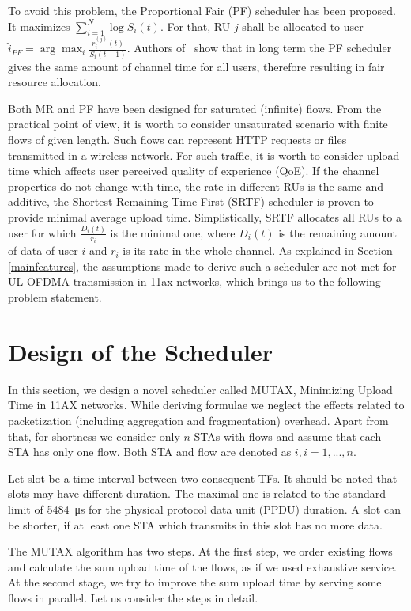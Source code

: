 To avoid this problem, the Proportional Fair (PF) scheduler has been proposed.
It maximizes $\sum_{i=1}^{N} \log{S_i(t)}$.
For that, RU $j$ shall be allocated to user $\hat{i}_{PF}= \arg \max_i \frac{r_i^{(j)}(t)}{S_{i}(t-1)}.$
Authors of~\cite{kwan2009proportional} show that in long term the PF scheduler gives the same amount of channel time for all users, therefore resulting in fair resource allocation.

Both MR and PF have been designed for saturated (infinite) flows.
From the practical point of view, it is worth to consider unsaturated scenario with finite flows of given length.
Such flows can represent HTTP requests or files transmitted in a wireless network.
For such traffic, it is worth to consider upload time which affects user perceived quality of experience (QoE).
If the channel properties do not change with time, the rate in different RUs is the same and additive, the Shortest Remaining Time First (SRTF) scheduler is proven to provide minimal average upload time.
Simplistically, SRTF allocates all RUs to a user for which $\frac{D_i(t)}{r_i}$ is the minimal one, where $D_i(t)$ is the remaining amount of data of user $i$ and $r_i$ is its rate in the whole channel.
As explained in Section \ref{mainfeatures}, the assumptions made to derive such a scheduler are not met for UL OFDMA transmission in 11ax networks, which brings us to the following problem statement.


\section{Design of the Scheduler}
\label{mutex}
In this section, we design a novel scheduler called MUTAX, Minimizing Upload Time in 11AX networks. While deriving formulae we neglect the effects related to packetization (including aggregation and fragmentation) overhead. Apart from that, for shortness we consider only $n$ STAs with flows and assume that each STA has only one flow. Both STA and flow are denoted as $i, i=1,...,n$.

Let slot be a time interval between two consequent TFs.
It should be noted that slots may have different duration. The maximal one is related to the standard limit of \SI{5484}{\us} for the physical protocol data unit (PPDU) duration. A slot can be shorter, if at least one STA which transmits in this slot has no more data.

The MUTAX algorithm has two steps. At the first step, we order existing flows and calculate the sum upload time of the flows, as if we used exhaustive service.
At the second stage, we try to improve the sum upload time by serving some flows in parallel.
Let us consider the steps in detail.

